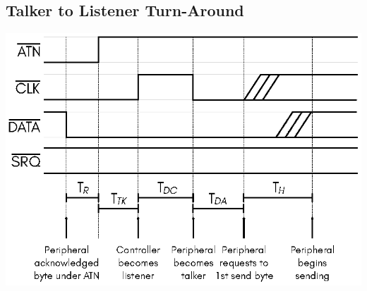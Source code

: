 \subsection{Talker to Listener Turn-Around}

\begin{center}
\includegraphics{images/IEC-Timing-Diagrams/IEC-Timing-Diagram-TurnAround}
\end{center}

